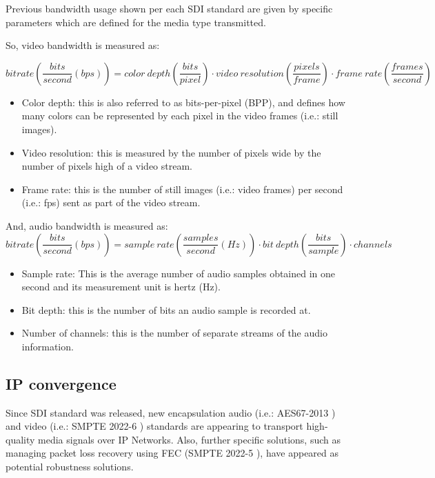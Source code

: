 Previous bandwidth usage shown per each SDI standard are given by specific parameters which are defined for the media type transmitted.

So, video bandwidth is measured as:

\begin{equation}\label{E:videobitrate}
bitrate (\frac{bits}{second} (bps)) = color\ depth (\frac{bits}{pixel}) \cdot video\ resolution (\frac{pixels}{frame}) \cdot frame\ rate (\frac{frames}{second}) 
\end{equation}

\begin{itemize}
\item Color depth: this is also referred to as bits-per-pixel (BPP), and defines how many colors can be represented by each pixel in the video frames (i.e.: still images).
\item Video resolution: this is measured by the number of pixels wide by the number of pixels high of a video stream.
\item Frame rate: this is the number of still images (i.e.: video frames) per second (i.e.: fps) sent as part of the video stream. 
\end{itemize}

And, audio bandwidth is measured as:
\begin{equation}\label{E:videobitrate}
bitrate (\frac{bits}{second} (bps)) = sample\ rate (\frac{samples}{second}(Hz)) \cdot bit\ depth (\frac{bits}{sample}) \cdot channels  
\end{equation}

\begin{itemize}
\item Sample rate: This is the average number of audio samples obtained in one second and its measurement unit is hertz (Hz).
\item Bit depth: this is the number of bits an audio sample is recorded at.
\item Number of channels: this is the number of separate streams of the audio information.
\end{itemize}

\subsection{IP convergence}

Since SDI standard was released, new encapsulation audio (i.e.: AES67-2013 \cite{AES}) and video (i.e.: SMPTE 2022-6 \cite{ST2022}) standards are appearing to transport high-quality media signals over IP Networks. Also, further specific solutions, such as managing packet loss recovery using FEC (SMPTE 2022-5 \cite{ST20225}), have appeared as potential robustness solutions.


